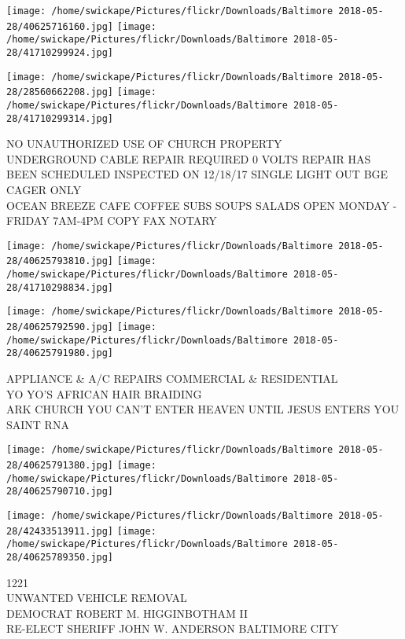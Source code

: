 \documentclass[10pt,letterpaper]{article}
\begin{document}
\texttt{[image: /home/swickape/Pictures/flickr/Downloads/Baltimore 2018-05-28/40625716160.jpg]}
\texttt{[image: /home/swickape/Pictures/flickr/Downloads/Baltimore 2018-05-28/41710299924.jpg]}

\texttt{[image: /home/swickape/Pictures/flickr/Downloads/Baltimore 2018-05-28/28560662208.jpg]}
\texttt{[image: /home/swickape/Pictures/flickr/Downloads/Baltimore 2018-05-28/41710299314.jpg]}

NO UNAUTHORIZED USE OF CHURCH PROPERTY\\
UNDERGROUND CABLE REPAIR REQUIRED 0 VOLTS REPAIR HAS BEEN SCHEDULED INSPECTED ON 12/18/17 SINGLE LIGHT OUT BGE\\
CAGER ONLY\\
OCEAN BREEZE CAFE COFFEE SUBS SOUPS SALADS OPEN MONDAY {-} FRIDAY 7AM{-}4PM COPY FAX NOTARY\\
\pagebreak

\texttt{[image: /home/swickape/Pictures/flickr/Downloads/Baltimore 2018-05-28/40625793810.jpg]}
\texttt{[image: /home/swickape/Pictures/flickr/Downloads/Baltimore 2018-05-28/41710298834.jpg]}

\texttt{[image: /home/swickape/Pictures/flickr/Downloads/Baltimore 2018-05-28/40625792590.jpg]}
\texttt{[image: /home/swickape/Pictures/flickr/Downloads/Baltimore 2018-05-28/40625791980.jpg]}

APPLIANCE \& A/C REPAIRS COMMERCIAL \& RESIDENTIAL\\
YO YO'S AFRICAN HAIR BRAIDING\\
ARK CHURCH YOU CAN'T ENTER HEAVEN UNTIL JESUS ENTERS YOU\\
SAINT RNA\\
\pagebreak

\texttt{[image: /home/swickape/Pictures/flickr/Downloads/Baltimore 2018-05-28/40625791380.jpg]}
\texttt{[image: /home/swickape/Pictures/flickr/Downloads/Baltimore 2018-05-28/40625790710.jpg]}

\texttt{[image: /home/swickape/Pictures/flickr/Downloads/Baltimore 2018-05-28/42433513911.jpg]}
\texttt{[image: /home/swickape/Pictures/flickr/Downloads/Baltimore 2018-05-28/40625789350.jpg]}

1221\\
UNWANTED VEHICLE REMOVAL\\
DEMOCRAT ROBERT M. HIGGINBOTHAM II\\
RE{-}ELECT SHERIFF JOHN W. ANDERSON BALTIMORE CITY\\
\pagebreak
\end{document}
